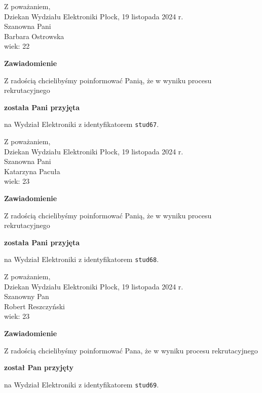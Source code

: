 \documentclass[12pt,a4paper]{article}
\begin{document}
\noindent
Z poważaniem,\\
Dziekan
Wydziału Elektroniki
\newpage
\hfill Płock, 19 listopada 2024 r.\\ 
\noindent 
Szanowna Pani \\
Barbara Ostrowska \\
wiek: 22

\bigskip

\begin{center}
{\Large\textbf{Zawiadomienie}}
\end{center}
\bigskip
Z radością chcielibyśmy poinformować Panią, że w wyniku procesu rekrutacyjnego
\begin{center}
\textsf{\textbf{została Pani przyjęta}} 
\end{center}
na Wydział Elektroniki z identyfikatorem \verb|stud67|.
\vspace{2cm}

\noindent
Z poważaniem,\\
Dziekan
Wydziału Elektroniki
\newpage
\hfill Płock, 19 listopada 2024 r.\\ 
\noindent 
Szanowna Pani \\
Katarzyna Pacuła \\
wiek: 23

\bigskip

\begin{center}
{\Large\textbf{Zawiadomienie}}
\end{center}
\bigskip
Z radością chcielibyśmy poinformować Panią, że w wyniku procesu rekrutacyjnego
\begin{center}
\textsf{\textbf{została Pani przyjęta}} 
\end{center}
na Wydział Elektroniki z identyfikatorem \verb|stud68|.
\vspace{2cm}

\noindent
Z poważaniem,\\
Dziekan
Wydziału Elektroniki
\newpage
\hfill Płock, 19 listopada 2024 r.\\ 
\noindent 
Szanowny Pan \\
Robert Reszczyński \\
wiek: 23

\bigskip

\begin{center}
{\Large\textbf{Zawiadomienie}}
\end{center}
\bigskip
Z radością chcielibyśmy poinformować Pana, że w wyniku procesu rekrutacyjnego
\begin{center}
\textsf{\textbf{został Pan przyjęty}} 
\end{center}
na Wydział Elektroniki z identyfikatorem \verb|stud69|.
\vspace{2cm}
\end{document}
